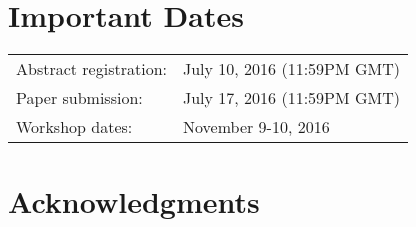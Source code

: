 \documentclass{hotnets16}
\begin{document}
\section{Important Dates}

{
\small
\begin{tabular}{ll}
Abstract registration:          & July 10, 2016 (11:59PM GMT) \\
Paper submission:               & July 17, 2016 (11:59PM GMT) \\
Workshop dates:                 & November 9-10, 2016 \\
\end{tabular}
}






\section*{Acknowledgments}

 
\begin{small}

\end{small}
\label{last-page}
\end{document}
